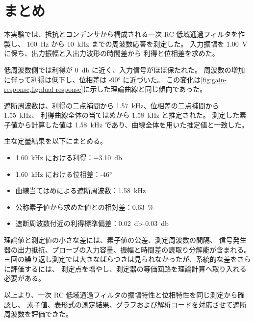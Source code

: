 \section{まとめ}
\label{sec:summary}

本実験では、抵抗とコンデンサから構成される一次 RC 低域通過フィルタを作製し、
\qty{100}{\hertz} から \qty{10}{\kilo\hertz} までの周波数応答を測定した。
入力振幅を \qty{1.00}{\volt} に保ち、出力振幅と入出力波形の時間差から
利得と位相差を求めた。

低周波数側では利得が \qty{0}{\decibel} に近く、入力信号がほぼ保たれた。
周波数の増加に伴って利得は低下し、位相差は \ang{-90} に近づいた。
この変化は\cref{fig:gain-response,fig:dual-response}に示した理論曲線と同じ傾向であった。

遮断周波数は、利得の二点補間から \qty{1.57}{\kilo\hertz}、位相差の二点補間から \qty{1.55}{\kilo\hertz}、
利得曲線全体の当てはめから \qty{1.58}{\kilo\hertz} と推定された。
測定した素子値から計算した値は \qty{1.58}{\kilo\hertz} であり、曲線全体を用いた推定値と一致した。

主な定量結果を以下にまとめる。

\begin{itemize}[leftmargin=3em,itemsep=0.3em]
  \item \qty{1.60}{\kilo\hertz} における利得：\qty{-3.10}{\decibel}
  \item \qty{1.60}{\kilo\hertz} における位相差：\ang{-46}
  \item 曲線当てはめによる遮断周波数：\qty{1.58}{\kilo\hertz}
  \item 公称素子値から求めた値との相対差：\qty{0.63}{\percent}
  \item 遮断周波数付近の利得標準偏差：\qtyrange{0.02}{0.03}{\decibel}
\end{itemize}


理論値と測定値の小さな差には、素子値の公差、測定周波数の間隔、
信号発生器の出力抵抗、プローブの入力容量、振幅と時間差の読取り分解能が含まれる。
三回の繰り返し測定では大きなばらつきは見られなかったが、系統的な差をさらに評価するには、
測定点を増やし、測定器の等価回路を理論計算へ取り入れる必要がある。

以上より、一次 RC 低域通過フィルタの振幅特性と位相特性を同じ測定から確認し、
素子値、表形式の測定結果、グラフおよび解析コードを対応させて遮断周波数を評価できた。
